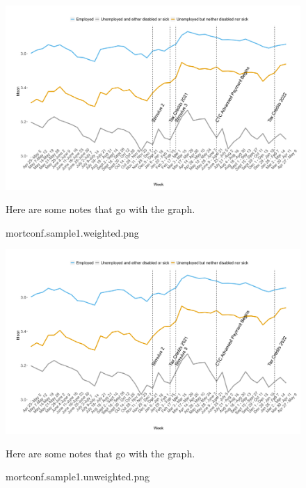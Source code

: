 \documentclass[12pt]{article}
\begin{document}
\begin{figure}[!ht]\label{mortconf.sample1.weighted.png}
\caption{mortconf.sample1.weighted.png}
\centering
\includegraphics[scale=0.3]{mortconf.sample1.weighted.png}
\medskip 
\begin{minipage}{0.65\textwidth} 
{\footnotesize Here are some notes that go with the graph.  \par}
\end{minipage}
\end{figure}

\begin{figure}[!ht]\label{mortconf.sample1.unweighted.png}
\caption{mortconf.sample1.unweighted.png}
\centering
\includegraphics[scale=0.3]{mortconf.sample1.unweighted.png}
\medskip 
\begin{minipage}{0.65\textwidth} 
{\footnotesize Here are some notes that go with the graph.  \par}
\end{minipage}
\end{figure}
\end{document}
